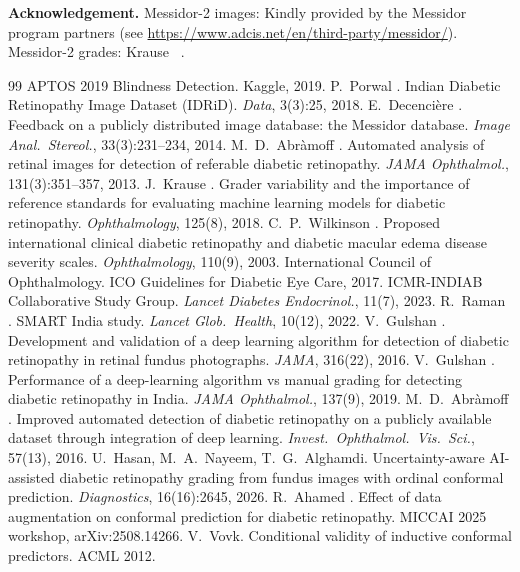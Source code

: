 \documentclass[10pt,twocolumn,letterpaper]{article}
\begin{document}


\textbf{Acknowledgement.} Messidor-2 images: Kindly provided by the Messidor program partners (see \url{https://www.adcis.net/en/third-party/messidor/}). Messidor-2 grades: Krause \etal~\cite{krause}.

{\small
\begin{thebibliography}{99}\setlength{\itemsep}{0pt}
 APTOS 2019 Blindness Detection. Kaggle, 2019.
 P.~Porwal \etal. Indian Diabetic Retinopathy Image Dataset (IDRiD). \emph{Data}, 3(3):25, 2018.
 E.~Decenci\`ere \etal. Feedback on a publicly distributed image database: the Messidor database. \emph{Image Anal.\ Stereol.}, 33(3):231--234, 2014.
 M.~D.~Abr\`amoff \etal. Automated analysis of retinal images for detection of referable diabetic retinopathy. \emph{JAMA Ophthalmol.}, 131(3):351--357, 2013.
 J.~Krause \etal. Grader variability and the importance of reference standards for evaluating machine learning models for diabetic retinopathy. \emph{Ophthalmology}, 125(8), 2018.
 C.~P.~Wilkinson \etal. Proposed international clinical diabetic retinopathy and diabetic macular edema disease severity scales. \emph{Ophthalmology}, 110(9), 2003.
 International Council of Ophthalmology. ICO Guidelines for Diabetic Eye Care, 2017.
 ICMR-INDIAB Collaborative Study Group. \emph{Lancet Diabetes Endocrinol.}, 11(7), 2023.
 R.~Raman \etal. SMART India study. \emph{Lancet Glob.\ Health}, 10(12), 2022.
 V.~Gulshan \etal. Development and validation of a deep learning algorithm for detection of diabetic retinopathy in retinal fundus photographs. \emph{JAMA}, 316(22), 2016.
 V.~Gulshan \etal. Performance of a deep-learning algorithm vs manual grading for detecting diabetic retinopathy in India. \emph{JAMA Ophthalmol.}, 137(9), 2019.
 M.~D.~Abr\`amoff \etal. Improved automated detection of diabetic retinopathy on a publicly available dataset through integration of deep learning. \emph{Invest.\ Ophthalmol.\ Vis.\ Sci.}, 57(13), 2016.
 U.~Hasan, M.~A.~Nayeem, T.~G.~Alghamdi. Uncertainty-aware AI-assisted diabetic retinopathy grading from fundus images with ordinal conformal prediction. \emph{Diagnostics}, 16(16):2645, 2026.
 R.~Ahamed \etal. Effect of data augmentation on conformal prediction for diabetic retinopathy. MICCAI 2025 workshop, arXiv:2508.14266.
 V.~Vovk. Conditional validity of inductive conformal predictors. ACML 2012.

\end{thebibliography}}
\end{document}
